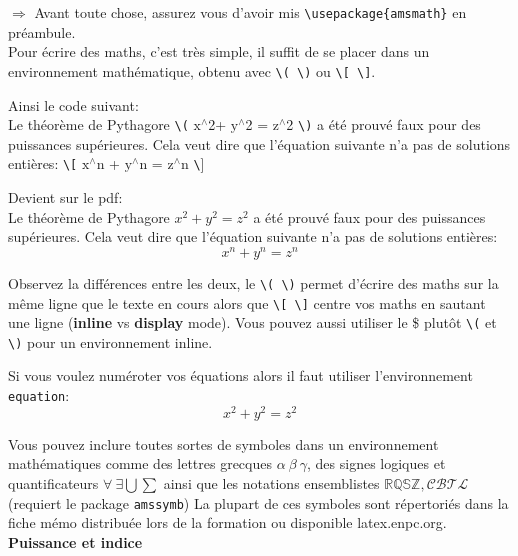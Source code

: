 \documentclass[11pt]{article}				%
\newcommand{\tb}{\textbackslash}
\newcommand{\cmd}[2]{\texttt{\textbackslash #1}\texttt{\{#2\}}}
\begin{document}
$\Rightarrow$ Avant toute chose, assurez vous d'avoir mis \cmd{usepackage}{amsmath} en préambule.\\

Pour écrire des maths, c'est très simple, il suffit de se placer dans un environnement mathématique, obtenu avec \texttt{\tb( \tb)} ou \texttt{\tb[ \tb]}. 

\begin{multicols}{2}
Ainsi le code suivant:\\
\textsf{Le théorème de Pythagore \texttt{\tb(} $\text{x}^{\wedge}$2+ $\text{y}^{\wedge}$2 = $\text{z}^{\wedge}$2 \texttt{\tb)} a été prouvé faux pour des puissances supérieures. Cela veut dire que l'équation suivante n'a pas de solutions entières:
	 \texttt{\tb[} $\text{x}^{\wedge}$n + $\text{y}^{\wedge}$n = $\text{z}^{\wedge}$n \texttt{\tb}] }
	
	\columnbreak
	
	Devient sur le pdf:\\	
	Le théorème de Pythagore $x^2 + y^2 = z^2$ a été prouvé faux pour des puissances supérieures. Cela veut dire que l'équation suivante n'a pas de solutions entières: \[ x^n + y^n = z^n \]
	
	
	
\end{multicols}

Observez la différences entre les deux, le \texttt{\tb( \tb)} permet d'écrire des maths sur la même ligne que le texte en cours alors que \texttt{\tb[ \tb]} centre vos maths en sautant une ligne (\textbf{inline} vs \textbf{display} mode). Vous pouvez aussi utiliser le \$ plutôt \texttt{\tb(} et \texttt{\tb)} pour un environnement inline.

Si vous voulez numéroter vos équations alors il faut utiliser l'environnement \texttt{equation}:
\begin{equation}
x^2 +y^2 = z^2
\end{equation}

Vous pouvez inclure toutes sortes de symboles dans un environnement mathématiques comme des lettres grecques $\alpha \ \beta \ \gamma$, des signes logiques et quantificateurs $\forall \ \exists \bigcup \sum$ ainsi que les notations ensemblistes $\mathbb{RQSZ}, \mathcal{CBTL}$ (requiert le package \verb|amssymb|) La plupart de ces symboles sont répertoriés dans la fiche mémo distribuée lors de la formation ou disponible latex.enpc.org.\\

\textbf{Puissance et indice}\\
\end{document}
